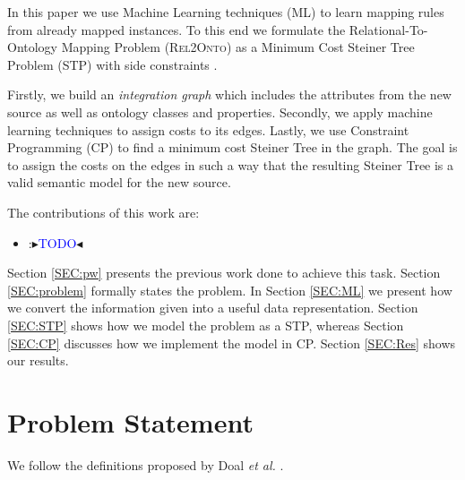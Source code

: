 \documentclass[letterpaper]{article} %
\newcommand{\authornote}[3]{
  {\fbox{\sc 
  #1}:$\blacktriangleright$\textcolor{#2}{\small{#3}}$\blacktriangleleft$}%
}
\newcommand{\ddg}[1]{\authornote{DDG}{blue}{#1}}
\newcommand{\relonto}{\textsc{Rel2Onto}}
\newcommand{\etal}{\textit{et al.}}
\begin{document}
In this paper we use Machine Learning techniques (ML) to learn mapping rules from already mapped instances.
To this end we formulate the Relational-To-Ontology Mapping Problem (\relonto{}) as a Minimum Cost Steiner Tree Problem (STP) with side constraints \cite{deuna2016steiner}.

Firstly, we build an \emph{integration graph} which includes the 
attributes from the new source as well as ontology classes and properties. 
Secondly, we apply machine learning techniques to 
assign costs to its edges. 
Lastly, we use Constraint Programming (CP) to 
find a minimum cost Steiner Tree in the graph.
The goal is to assign the costs 
on the edges in such a way that the resulting Steiner Tree is a valid semantic model for the new source. 

The contributions of this work are:
\begin{itemize}
	\item \ddg{TODO}
\end{itemize}

Section \ref{SEC:pw} presents the previous work done to achieve this task. 
Section \ref{SEC:problem} formally states the problem. 
In Section \ref{SEC:ML} we present how we convert the information given into a 
useful data representation. 
Section \ref{SEC:STP} shows how we model the problem as a STP, 
whereas Section \ref{SEC:CP} discusses how we implement the model in CP. 
Section \ref{SEC:Res} shows our results. 

\section{Problem Statement \label{SEC:problem}}
We follow the definitions proposed by Doal \etal{} \cite{doan2012principles}.
\end{document}
